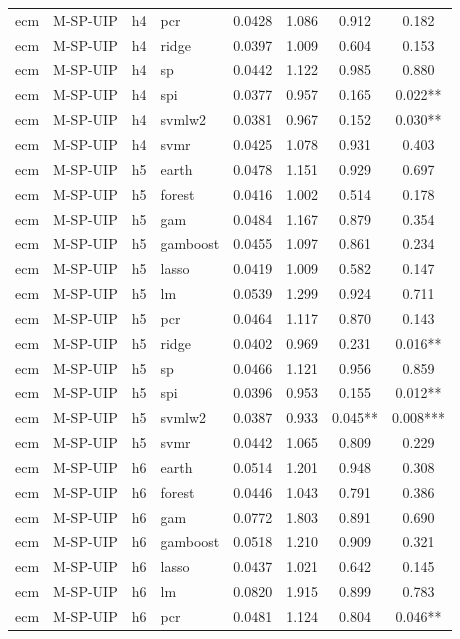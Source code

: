 \begin{ThreePartTable}
\begin{longtable}[t]{llclcccc}
ecm & M-SP-UIP & h4 & pcr & 0.0428 & 1.086 & 0.912 & 0.182\\
ecm & M-SP-UIP & h4 & ridge & 0.0397 & 1.009 & 0.604 & 0.153\\
ecm & M-SP-UIP & h4 & sp & 0.0442 & 1.122 & 0.985 & 0.880\\
ecm & M-SP-UIP & h4 & spi & 0.0377 & 0.957 & 0.165 & 0.022**\\
ecm & M-SP-UIP & h4 & svmlw2 & 0.0381 & 0.967 & 0.152 & 0.030**\\
ecm & M-SP-UIP & h4 & svmr & 0.0425 & 1.078 & 0.931 & 0.403\\
\addlinespace
ecm & M-SP-UIP & h5 & earth & 0.0478 & 1.151 & 0.929 & 0.697\\
ecm & M-SP-UIP & h5 & forest & 0.0416 & 1.002 & 0.514 & 0.178\\
ecm & M-SP-UIP & h5 & gam & 0.0484 & 1.167 & 0.879 & 0.354\\
ecm & M-SP-UIP & h5 & gamboost & 0.0455 & 1.097 & 0.861 & 0.234\\
ecm & M-SP-UIP & h5 & lasso & 0.0419 & 1.009 & 0.582 & 0.147\\
ecm & M-SP-UIP & h5 & lm & 0.0539 & 1.299 & 0.924 & 0.711\\
ecm & M-SP-UIP & h5 & pcr & 0.0464 & 1.117 & 0.870 & 0.143\\
ecm & M-SP-UIP & h5 & ridge & 0.0402 & 0.969 & 0.231 & 0.016**\\
ecm & M-SP-UIP & h5 & sp & 0.0466 & 1.121 & 0.956 & 0.859\\
ecm & M-SP-UIP & h5 & spi & 0.0396 & 0.953 & 0.155 & 0.012**\\
ecm & M-SP-UIP & h5 & svmlw2 & 0.0387 & 0.933 & 0.045** & 0.008***\\
ecm & M-SP-UIP & h5 & svmr & 0.0442 & 1.065 & 0.809 & 0.229\\
\addlinespace
ecm & M-SP-UIP & h6 & earth & 0.0514 & 1.201 & 0.948 & 0.308\\
ecm & M-SP-UIP & h6 & forest & 0.0446 & 1.043 & 0.791 & 0.386\\
ecm & M-SP-UIP & h6 & gam & 0.0772 & 1.803 & 0.891 & 0.690\\
ecm & M-SP-UIP & h6 & gamboost & 0.0518 & 1.210 & 0.909 & 0.321\\
ecm & M-SP-UIP & h6 & lasso & 0.0437 & 1.021 & 0.642 & 0.145\\
ecm & M-SP-UIP & h6 & lm & 0.0820 & 1.915 & 0.899 & 0.783\\
ecm & M-SP-UIP & h6 & pcr & 0.0481 & 1.124 & 0.804 & 0.046**\\

\end{longtable}
\end{ThreePartTable}

